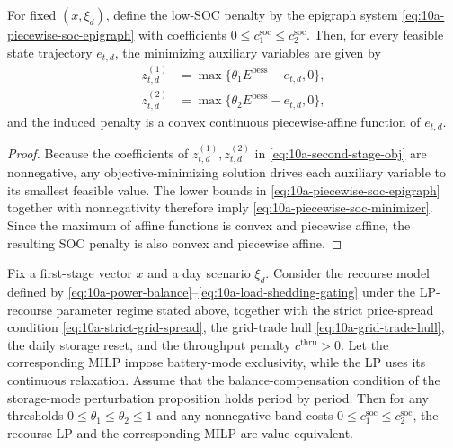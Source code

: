 \begin{proposition}
For fixed \((x,\xi_d)\), define the low-SOC penalty by the epigraph system \eqref{eq:10a-piecewise-soc-epigraph} with coefficients \(0 \le c^{\mathrm{soc}}_1 \le c^{\mathrm{soc}}_2\). Then, for every feasible state trajectory \(e_{t,d}\), the minimizing auxiliary variables are given by
\begin{align}
z^{(1)}_{t,d} &= \max\{\theta_1 E^{\mathrm{bess}} - e_{t,d},0\},\\
z^{(2)}_{t,d} &= \max\{\theta_2 E^{\mathrm{bess}} - e_{t,d},0\},
\label{eq:10a-piecewise-soc-minimizer}
\end{align}
and the induced penalty is a convex continuous piecewise-affine function of \(e_{t,d}\).
\end{proposition}

\begin{proof}
Because the coefficients of \(z^{(1)}_{t,d},z^{(2)}_{t,d}\) in \eqref{eq:10a-second-stage-obj} are nonnegative, any objective-minimizing solution drives each auxiliary variable to its smallest feasible value. The lower bounds in \eqref{eq:10a-piecewise-soc-epigraph} together with nonnegativity therefore imply \eqref{eq:10a-piecewise-soc-minimizer}. Since the maximum of affine functions is convex and piecewise affine, the resulting SOC penalty is also convex and piecewise affine.
\end{proof}

\begin{theorem}
Fix a first-stage vector \(x\) and a day scenario \(\xi_d\). Consider the recourse model defined by \eqref{eq:10a-power-balance}--\eqref{eq:10a-load-shedding-gating} under the LP-recourse parameter regime stated above, together with the strict price-spread condition \eqref{eq:10a-strict-grid-spread}, the grid-trade hull \eqref{eq:10a-grid-trade-hull}, the daily storage reset, and the throughput penalty \(c^{\mathrm{thru}}>0\). Let the corresponding MILP impose battery-mode exclusivity, while the LP uses its continuous relaxation. Assume that the balance-compensation condition of the storage-mode perturbation proposition holds period by period. Then for any thresholds \(0 \le \theta_1 \le \theta_2 \le 1\) and any nonnegative band costs \(0 \le c^{\mathrm{soc}}_1 \le c^{\mathrm{soc}}_2\), the recourse LP and the corresponding MILP are value-equivalent.
\end{theorem}

